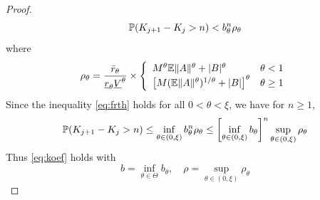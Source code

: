\begin{proof}
\begin{equation}
    \label{eq:frth}
    \P (K_{j+1} - K_j > n) < b_{\theta}^n \rho_{\theta}
  \end{equation}
  where
  \[
  \rho_{\theta} = {
    \bar r_{\theta}
    \over
    \underline r_{\theta} \underline V^\theta
  } \times \left\{
  \begin{array}{ll}
    M^\theta \E \|A\|^\theta + |B|^\theta
    &
    \theta < 1
    \\
    \left[
      M (\E \|A\|^\theta)^{1/\theta} + |B|      
    \right]^\theta
    &
    \theta \geq 1
  \end{array}
  \right.
  \]
  Since the inequality \eqref{eq:frth} holds for all
  $0 < \theta < \xi$, we have for $n \geq 1$,
  \[
  \P (K_{j+1} - K_j> n)
  \leq
  \inf_{\theta \in (0, \xi)}
  b_\theta^n \rho_\theta
  \leq
  \left[
    \inf_{\theta \in (0, \xi)}
    b_{\theta}
    \right]^n
  \sup_{\theta \in (0, \xi)} \rho_{\theta}
  \]
  Thus \eqref{eq:koef} holds with
  \begin{equation}
    \label{eq:b_def}
    b = \inf_{\theta \in \Theta} b_{\theta},
    \quad
    \rho = \sup_{\theta \in (0, \xi)} \rho_{\theta}
  \end{equation}
\end{proof}

